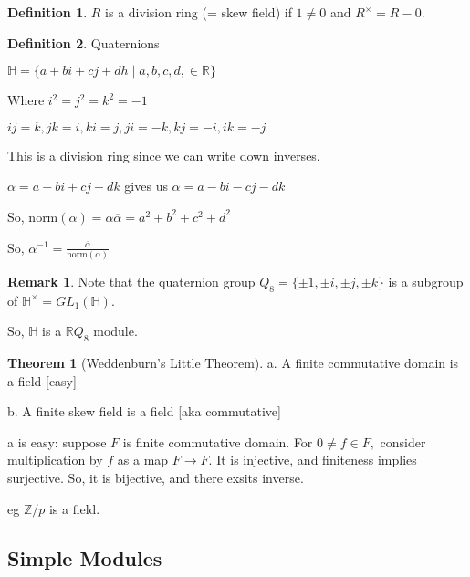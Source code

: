 \documentclass{article}
\theoremstyle{definition}
\newtheorem*{definition}{Definition}
\newtheorem{theorem}{Theorem}
\newtheorem*{remark}{Remark}
\begin{document}
\begin{definition}
    \(R\) is a division ring (= skew field) if \(1 \neq 0\) and \(R^\times = R - 0\).
\end{definition}

\begin{definition}
    Quaternions

    \(\mathbb{H} = \{ a + bi + cj + dh \mid a,b,c,d,\in \mathbb{R} \} \) 

    Where \(i^2 = j^2 = k^2 = -1\) 

    \(ij = k, jk = i, ki = j, ji = -k, kj = -i, ik = -j\) 

    This is a division ring since we can write down inverses.

    \(\alpha = a + bi + cj + dk\) gives us \(\overline{\alpha} = a - bi - cj - dk\) 

    So, \(\text{norm}(\alpha) = \alpha \overline{\alpha } = a^2 + b^2 + c^2 + d^2\) 

    So, \(\alpha ^{-1} = \frac{\overline{\alpha }}{\text{norm}(\alpha)}\) 
\end{definition}

\begin{remark}

    Note that the quaternion group \(Q_8 = \{ \pm 1, \pm i, \pm j, \pm k\} \) is a subgroup of \(\mathbb{H} ^\times = GL_1(\mathbb{H})\).

    So, \(\mathbb{H}\) is a \(\mathbb{R} Q_8\) module.

\end{remark}

\begin{theorem}
    [Weddenburn's Little Theorem]

    a. A finite commutative domain is a field [easy]

    b. A finite skew field is a field [aka commutative]

\end{theorem}

a is easy: suppose \(F\) is finite commutative domain. For \(0 \neq f\in F,\) consider multiplication by \(f\) as a map \(F \to F\). It is injective, and finiteness implies surjective. So, it is bijective, and there exsits inverse.

eg \(\mathbb{Z} / p\) is a field.

\subsection*{Simple Modules}
\end{document}
